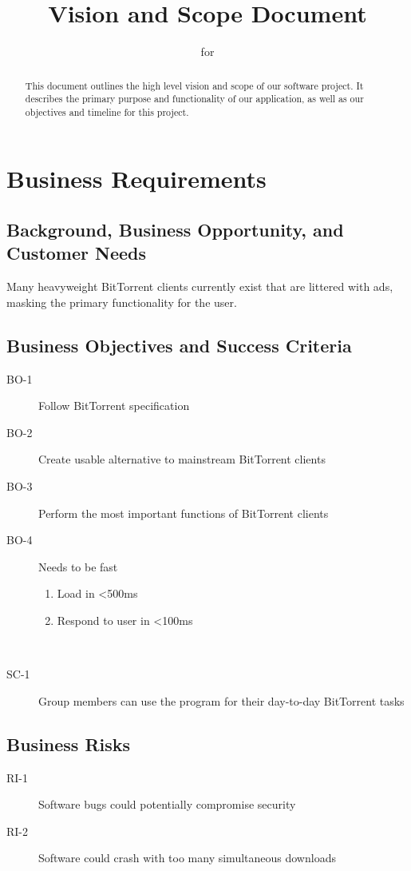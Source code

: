 \documentclass[letter]{scrartcl}
\newcommand{\app}{\sc{393torrent}}
\begin{document}
\title{Vision and Scope Document}
\subtitle{for \app}
\date{} %

\maketitle

\begin{abstract}
This document outlines the high level vision and scope of our software project.  It describes the primary purpose and functionality of our application, as well as our objectives and timeline for this project. 
\end{abstract}

\tableofcontents
\pagebreak

\section{Business Requirements}
\subsection{Background, Business Opportunity, and Customer Needs}
Many heavyweight BitTorrent clients currently exist that are littered with ads, masking the primary functionality for the user.

\subsection{Business Objectives and Success Criteria}
\begin{description}
\item[BO-1] Follow BitTorrent specification
\item[BO-2] Create usable alternative to mainstream BitTorrent clients
\item[BO-3] Perform the most important functions of BitTorrent clients
\item[BO-4] Needs to be fast 
\begin{enumerate}
  \item Load in \textless500ms
  \item Respond to user in \textless100ms
\end{enumerate}
\\
\item[SC-1] Group members can use the program for their day-to-day BitTorrent tasks
\end{description}

\subsection{Business Risks}
\begin{description}
\item[RI-1] Software bugs could potentially compromise security
\item[RI-2] Software could crash with too many simultaneous downloads
\end{description}
\end{document}

